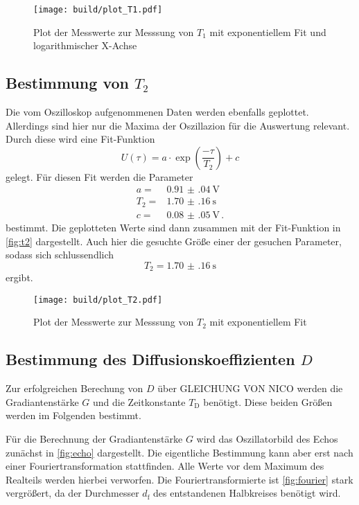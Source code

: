 \begin{figure}
    \centering
    \texttt{[image: build/plot\_T1.pdf]}
    \caption{Plot der Messwerte zur Messsung von $T_1$ mit exponentiellem Fit und logarithmischer X-Achse}
    \label{fig:t1}
\end{figure}

\subsection{Bestimmung von $T_2$}
\label{ssec:aus2}

Die vom Oszilloskop aufgenommenen Daten werden ebenfalls geplottet.
Allerdings sind hier nur die Maxima der Oszillazion für die Auswertung relevant.
Durch diese wird eine Fit-Funktion 
\begin{equation}
    U(\tau) = a \cdot \exp(\frac{- \tau}{T_2}) + c 
    \label{eq:fit_t2}
\end{equation}
gelegt.
Für diesen Fit werden die Parameter 
\begin{align*}
    a =& \SI{0.91(04)}{\volt} \\
    T_2 =& \SI{1.70(16)}{\second} \\
    c =& \SI{0.08(05)}{\volt} \, .
\end{align*}
bestimmt.
Die geplotteten Werte sind dann zusammen mit der Fit-Funktion in \autoref{fig:t2} dargestellt.
Auch hier die gesuchte Größe einer der gesuchen Parameter, sodass sich schlussendlich 
\begin{equation}
    T_2 = \SI{1.70(16)}{\second} 
    \label{eq:t2_wert}
\end{equation}
ergibt.
\begin{figure}
    \centering
    \texttt{[image: build/plot\_T2.pdf]}
    \caption{Plot der Messwerte zur Messsung von $T_2$ mit exponentiellem Fit}
    \label{fig:t2}
\end{figure}

\subsection{Bestimmung des Diffusionskoeffizienten $D$}
\label{ssec:aus3}

Zur erfolgreichen Berechung von $D$ über GLEICHUNG VON NICO werden die Gradiantenstärke $G$ und die Zeitkonstante $T_\text{D}$ benötigt. 
Diese beiden Größen werden im Folgenden bestimmt.

Für die Berechnung der Gradiantenstärke $G$ wird das Oszillatorbild des Echos zunächst in \autoref{fig:echo} dargestellt.
Die eigentliche Bestimmung kann aber erst nach einer Fouriertransformation stattfinden. 
Alle Werte vor dem Maximum des Realteils werden hierbei verworfen.
Die Fouriertransformierte ist \autoref{fig:fourier} stark vergrößert, da der Durchmesser $d_\text{f}$ des entstandenen Halbkreises benötigt wird.

